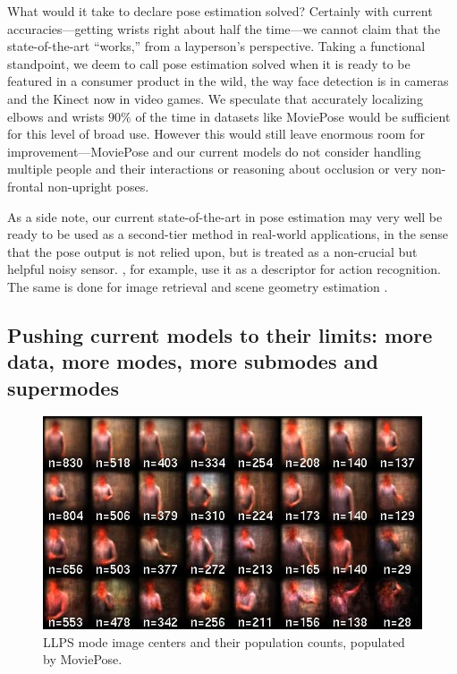 What would it take to declare pose estimation solved?  Certainly with current 
accuracies---getting wrists right about half the time---we cannot claim that 
the state-of-the-art ``works,'' from a layperson's perspective.  Taking a 
functional standpoint, we deem to call pose estimation solved when it is ready 
to be featured in a consumer product in the wild, the way face detection is in 
cameras and the Kinect now in video games.  We speculate that accurately 
localizing elbows and wrists $90\%$ of the time in datasets like MoviePose 
would be sufficient for this level of broad use.  However this would still 
leave enormous room for improvement---MoviePose and our current models do not 
consider handling multiple people and their interactions or reasoning about 
occlusion or very non-frontal non-upright poses.

As a side note, our current state-of-the-art in pose estimation may very well 
be ready to be used as a second-tier method in real-world applications, in the 
sense that the pose output is not relied upon, but is treated as a non-crucial 
but helpful noisy sensor.  \citet{wang2011}, for example, use it as a 
descriptor for action recognition. The same is done for image retrieval 
\citep{posesearch} and scene geometry estimation \citep{gupta11,delaitre12}.


\subsection{Pushing current models to their limits: more data, more modes, more
submodes and supermodes}

\begin{figure}[tb!]
\centering
\includegraphics[width=0.99\linewidth]{figs/llps-modes.jpg}
\caption[LLPS modes and counts.]{
\label{fig:llps-modes-counts} LLPS mode image centers and their population 
counts, populated by MoviePose. }
\end{figure}

